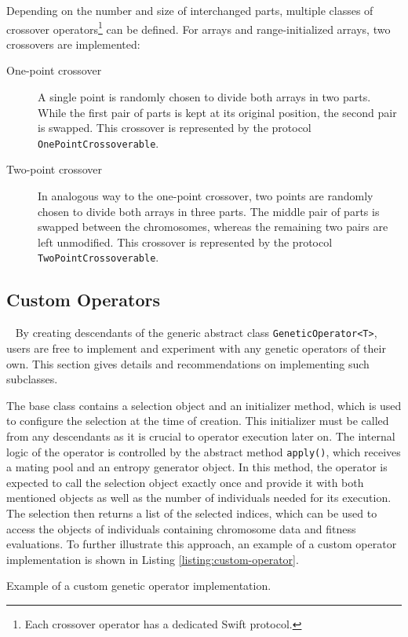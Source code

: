 Depending on the number and size of interchanged parts, multiple classes of crossover operators\footnote{Each crossover operator has a dedicated Swift protocol.} can be defined. For arrays and range-initialized arrays, two crossovers are implemented:
~
\begin{description}
	\item[One-point crossover]
	A single point is randomly chosen to divide both arrays in two parts. While the first pair of parts is kept at its original position, the second pair is swapped. This crossover is represented by the protocol \texttt{OnePointCrossoverable}.

	\item[Two-point crossover]
	In analogous way to the one-point crossover, two points are randomly chosen to divide both arrays in three parts. The middle pair of parts is swapped between the chromosomes, whereas the remaining two pairs are left unmodified. This crossover is represented by the protocol \texttt{TwoPointCrossoverable}.
\end{description}

\subsection{Custom Operators}~\label{section:custom-operators}
By creating descendants of the generic abstract class \texttt{GeneticOperator<T>}, users are free to implement and experiment with any genetic operators of their own. This section gives details and recommendations on implementing such subclasses.

The base class contains a selection object and an initializer method, which is used to configure the selection at the time of creation. This initializer must be called from any descendants as it is crucial to operator execution later on. The internal logic of the operator is controlled by the abstract method \texttt{apply()}, which receives a mating pool and an entropy generator object. In this method, the operator is expected to call the selection object exactly once and provide it with both mentioned objects as well as the number of individuals needed for its execution. The selection then returns a list of the selected indices, which can be used to access the objects of individuals containing chromosome data and fitness evaluations. To further illustrate this approach, an example of a custom operator implementation is shown in Listing \ref{listing:custom-operator}.

\begin{listing}[ht]
	\caption{Example of a custom genetic operator implementation.}
	\label{listing:custom-operator}
\end{listing}

